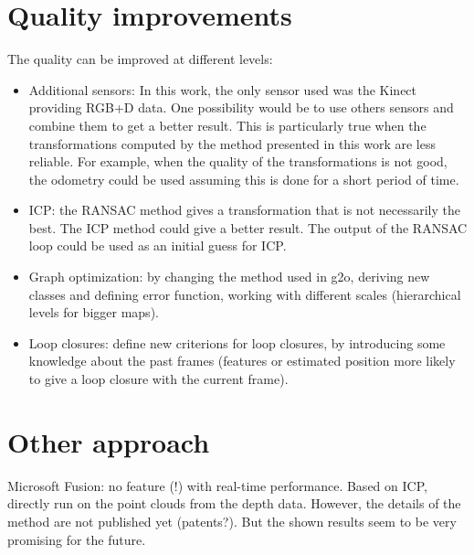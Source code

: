 \section{Quality improvements}

The quality can be improved at different levels:
\begin{itemize}
\item Additional sensors: In this work, the only sensor used was the Kinect providing RGB+D data. One possibility would be to use others sensors and combine them to get a better result. This is particularly true when the transformations computed by the method presented in this work are less reliable. For example, when the quality of the transformations is not good, the odometry could be used assuming this is done for a short period of time.
\item ICP: the RANSAC method gives a transformation that is not necessarily the best. The ICP method could give a better result. The output of the RANSAC loop could be used as an initial guess for ICP.
\item Graph optimization: by changing the method used in g2o, deriving new classes and defining error function, working with different scales (hierarchical levels for bigger maps).
\item Loop closures: define new criterions for loop closures, by introducing some knowledge about the past frames (features or estimated position more likely to give a loop closure with the current frame).
\end{itemize}

\section{Other approach}

Microsoft Fusion: no feature (!) with real-time performance. Based on ICP, directly run on the point clouds from the depth data. However, the details of the method are not published yet (patents?). But the shown results seem to be very promising for the future.

